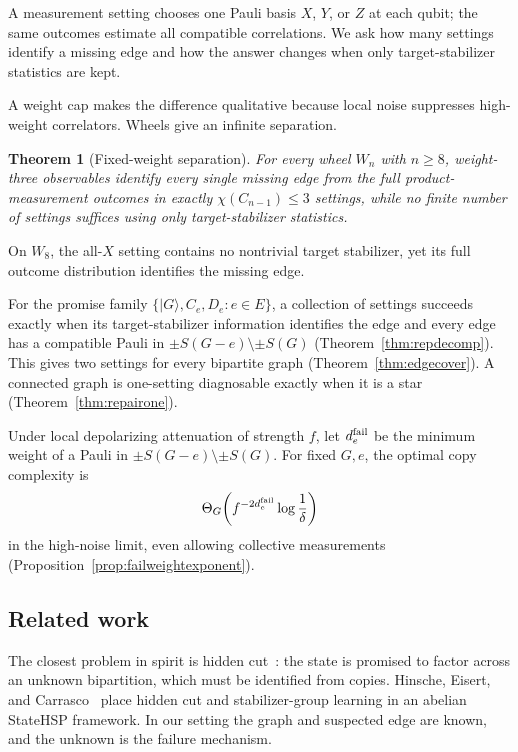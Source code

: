 \documentclass[11pt]{article}
\newtheorem{theorem}{Theorem}[section]
\theoremstyle{remark}
\begin{document}
A measurement setting chooses one Pauli basis \(X\), \(Y\), or \(Z\) at each qubit; the same outcomes estimate all compatible correlations.  We ask how many settings identify a missing edge and how the answer changes when only target-stabilizer statistics are kept.

A weight cap makes the difference qualitative because local noise suppresses high-weight correlators.  Wheels give an infinite separation.

\begin{theorem}[Fixed-weight separation]\label{thm:intro-sep}
For every wheel \(W_n\) with \(n\ge8\), weight-three observables identify every single missing edge from the full product-measurement outcomes in exactly \(\chi(C_{n-1})\le3\) settings, while no finite number of settings suffices using only target-stabilizer statistics.
\end{theorem}

On \(W_8\), the all-\(X\) setting contains no nontrivial target stabilizer, yet its full outcome distribution identifies the missing edge.

For the promise family \(\{|G\rangle,C_e,D_e:e\in E\}\), a collection of settings succeeds exactly when its target-stabilizer information identifies the edge and every edge has a compatible Pauli in \(\pm S(G-e)\setminus\pm S(G)\) (Theorem~\ref{thm:repdecomp}).  This gives two settings for every bipartite graph (Theorem~\ref{thm:edgecover}).  A connected graph is one-setting diagnosable exactly when it is a star (Theorem~\ref{thm:repairone}).

Under local depolarizing attenuation of strength \(f\), let \(d_e^{\rm fail}\) be the minimum weight of a Pauli in \(\pm S(G-e)\setminus\pm S(G)\).  For fixed \(G,e\), the optimal copy complexity is
\[
\Theta_G\!\left(f^{-2d_e^{\rm fail}}\log\frac1\delta\right)
\]
in the high-noise limit, even allowing collective measurements (Proposition~\ref{prop:failweightexponent}).

\subsection{Related work}

The closest problem in spirit is hidden cut~\cite{BGW25}: the state is promised to factor across an unknown bipartition, which must be identified from copies.  Hinsche, Eisert, and Carrasco~\cite{HEC26} place hidden cut and stabilizer-group learning in an abelian StateHSP framework.  In our setting the graph and suspected edge are known, and the unknown is the failure mechanism.
\end{document}
